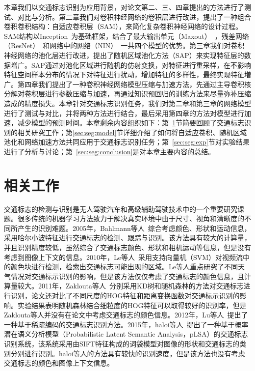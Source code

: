 本章我们以交通标志识别为应用背景，对论文第二、三、四章提出的方法进行了测试、对比与分析。第二章我们对卷积神经网络的卷积层进行改进，提出了一种组合卷积卷积结构：自适应卷积层（SAM），来简化复杂卷积神经网络的设计过程。SAM结构以Inception~\cite{szegedy2014going,szegedy2015rethinking,szegedy2016inception}为基础框架，结合了最大输出单元（Maxout）~\cite{goodfellow2013maxout}，残差网络（ResNet）~\cite{he2015deep}和网络中的网络（NIN）~\cite{DBLP:journals/corr/LinCY13}一共四个模型的优势。第三章我们对卷积神经网络的池化层进行改进，提出了随机区域池化方法（SAP）来实现特征层的数据増广。SAP通过对池化区域进行随机的仿射变换，对特征进行重采样，在不影响特征空间样本分布的情况下对特征进行扰动，增加特征的多样性，最终实现特征増广。第四章我们提出了一种卷积神经网络模型压缩与加速方法，先通过主导卷积核分解对卷积层进行参数压缩与加速，再通过知识预回归的训练方法来尽量弥补压缩造成的精度损失。本章针对交通标志识别任务，我们对第二章和第三章的网络模型进行了测试与对比，并将两种方法进行结合，最后采用第四章的方法对模型进行加速，减少模型的预测时间。本章剩余内容组织如下：第~\ref{sec:seg:relate}节简要回顾了交通标志识别的相关研究工作；第\ref{sec:seg:model}节详细介绍了如何将自适应卷积、随机区域池化和网络加速方法共同应用于交通标志识别任务；第~\ref{sec:seg:exp}节对实验结果进行了分析与讨论；第~\ref{sec:seg:conclusion}是对本章主要内容的总结。

\section{相关工作}
\label{sec:seg:relate}

交通标志的检测与识别是无人驾驶汽车和高级辅助驾驶技术中的一个重要研究课题。很多传统的机器学习方法致力于解决真实环境中由于尺寸、视角和清晰度的不同所产生的识别难题。2005年，Bahlmann等人~\cite{bahlmann2005system}综合考虑颜色、形状和运动信息，采用哈尔小波特征进行交通标志的检测、跟踪与识别。该方法具有较大的计算量，并且识别精度较低，虽然综合了交通标志颜色、形状和相机运动等信息，但是没有考虑到图像上下文的信息。2010年，Le等人~\cite{le2010real}采用支持向量机（SVM）对视频流中的颜色块进行检测，检索出交通标志可能出现的区域。Le等人重点研究了不同天气情况对交通标示识别的影响，但是该方法仅仅考虑了交通标志的颜色信息，且计算量较大。2011年，Zaklouta等人~\cite{zaklouta2011traffic}分别采用KD树和随机森林的方法对交通标志进行识别，论文还对比了不同尺度的HOG特征和距离变换函数对交通标示识别的影响。实验结果表明随机森林结合细粒度的HOG特征可以取得较好的识别率，但是Zaklouta等人并没有在论文中考虑交通标志的颜色信息。2012年，Lu等人~\cite{lu2012sparse}提出了一种基于稀疏编码的交通标志识别方法。2015年，haloi等人~\cite{haloi2015novel}提出了一种基于概率潜在语义分析模型（Probabilistic Latent Semantic Analysis，pLSA）的交通标志识别系统，该系统采用由SIFT特征构成的词袋模型对图像的形状和交通标志的类别分别进行识别。haloi等人的方法具有较快的识别速度，但是该方法也没有考虑交通标志的颜色和图像上下文信息。


